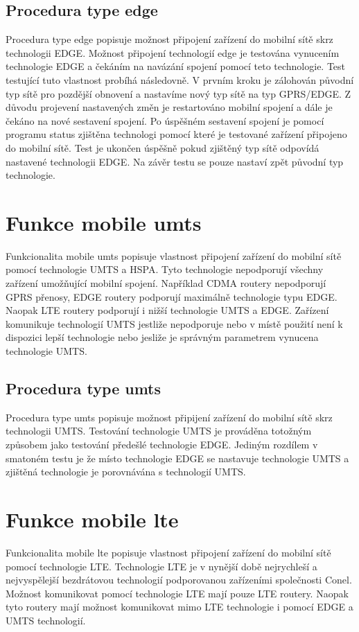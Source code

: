 \subsection{Procedura type edge}
Procedura type edge popisuje možnost připojení zařízení do mobilní sítě skrz technologii EDGE. Možnost připojení technologií edge je testována vynucením technologie EDGE a čekáním na navázání spojení pomocí teto technologie. Test testující tuto vlastnost probíhá následovně. V prvním kroku je zálohován původní typ sítě pro pozdější obnovení a nastavíme nový typ sítě na typ GPRS/EDGE. Z důvodu projevení nastavených změn je restartováno mobilní spojení a dále je čekáno na nové sestavení spojení. Po úspěšném sestavení spojení je pomocí programu status zjištěna technologi pomocí které je testované zařízení připojeno do mobilní sítě. Test je ukončen úspěšně pokud zjištěný typ sítě odpovídá nastavené technologii EDGE. Na závěr testu se pouze nastaví zpět původní typ technologie.

\section{Funkce mobile umts}
Funkcionalita mobile umts popisuje vlastnost připojení zařízení do mobilní sítě pomocí technologie UMTS a HSPA. Tyto technologie nepodporují všechny zařízení umožňující mobilní spojení. Například CDMA routery nepodporují GPRS přenosy, EDGE routery podporují maximálně technologie typu EDGE. Naopak LTE routery podporují i nižší technologie UMTS a EDGE. Zařízení komunikuje technologií UMTS jestliže nepodporuje nebo v místě použití není k dispozici lepší technologie nebo jesliže je správným parametrem vynucena technologie UMTS.

\subsection{Procedura type umts}
Procedura type umts popisuje možnost připijení zařízení do mobilní sítě skrz technologii UMTS. Testování technologie UMTS je prováděna totožným způsobem jako testování předešlé technologie EDGE. Jediným rozdílem v smatoném testu je že místo technologie EDGE se nastavuje technologie UMTS a zjištěná technologie je porovnávána s technologií UMTS.

\section{Funkce mobile lte}
Funkcionalita mobile lte popisuje vlastnost připojení zařízení do mobilní sítě pomocí technologie LTE. Technologie LTE je v nynější době nejrychleší a nejvyspělejší bezdrátovou technologií podporovanou zařízeními společnosti Conel. Možnost komunikovat pomocí technologie LTE mají pouze LTE routery. Naopak tyto routery mají možnost komunikovat mimo LTE technologie i pomocí EDGE a UMTS technologií.

